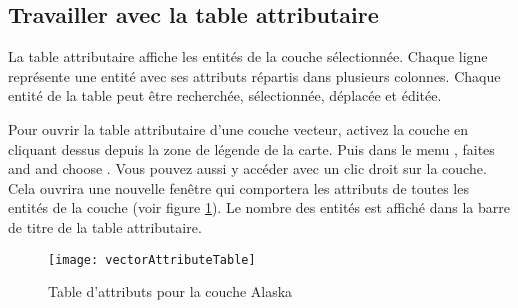 \subsection{Travailler avec la table attributaire}\label{sec:attribute table}

La table attributaire affiche les entités de la couche sélectionnée. Chaque ligne représente une entité avec ses attributs répartis dans  plusieurs colonnes. Chaque entité de la table peut être recherchée, sélectionnée, déplacée et éditée.

Pour ouvrir la table attributaire d'une couche vecteur, activez la couche en cliquant dessus depuis la zone de légende de la carte. Puis dans le menu  , faites and and choose . Vous pouvez aussi y accéder avec un clic droit sur la couche. Cela ouvrira une nouvelle fenêtre qui comportera les attributs de toutes les entités de la couche (voir figure \ref{fig:attributetable}). Le nombre des entités est affiché dans la barre de titre de la table attributaire.

\begin{figure}[ht]
   \begin{center}
   \texttt{[image: vectorAttributeTable]}
    \caption{Table d'attributs pour la couche Alaska \nixcaption}\label{fig:attributetable}
\end{center} 
\end{figure}



